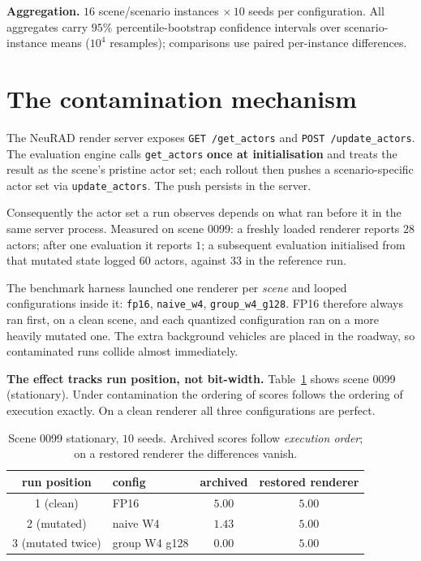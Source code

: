 \documentclass[conference]{IEEEtran}
\begin{document}
\textbf{Aggregation.} $16$ scene/scenario instances $\times\,10$ seeds per configuration. All
aggregates carry $95\%$ percentile-bootstrap confidence intervals over scenario-instance means
($10^4$ resamples); comparisons use paired per-instance differences.

\section{The contamination mechanism}
\label{sec:mech}
The NeuRAD render server exposes \texttt{GET /get\_actors} and \texttt{POST /update\_actors}. The
evaluation engine calls \texttt{get\_actors} \textbf{once at initialisation} and treats the result
as the scene's pristine actor set; each rollout then pushes a scenario-specific actor set via
\texttt{update\_actors}. The push persists in the server.

Consequently the actor set a run observes depends on what ran before it in the same server
process. Measured on scene 0099: a freshly loaded renderer reports $28$ actors; after one
evaluation it reports $1$; a subsequent evaluation initialised from that mutated state logged
$60$ actors, against $33$ in the reference run.

The benchmark harness launched one renderer per \emph{scene} and looped configurations inside it:
\texttt{fp16}, \texttt{naive\_w4}, \texttt{group\_w4\_g128}. FP16 therefore always ran first, on a
clean scene, and each quantized configuration ran on a more heavily mutated one. The extra
background vehicles are placed in the roadway, so contaminated runs collide almost immediately.

\textbf{The effect tracks run position, not bit-width.} Table~\ref{tab:position} shows scene 0099
(stationary). Under contamination the ordering of scores follows the ordering of execution
exactly. On a clean renderer all three configurations are perfect.

\begin{table}[t]\centering
\caption{Scene 0099 stationary, $10$ seeds. Archived scores follow \emph{execution order};
on a restored renderer the differences vanish.}
\label{tab:position}
\begin{tabular}{clcc}
\toprule
run position & config & archived & restored renderer \\
\midrule
1 (clean) & FP16 & $5.00$ & $5.00$ \\
2 (mutated) & naive W4 & $1.43$ & $\mathbf{5.00}$ \\
3 (mutated twice) & group W4 g128 & $0.00$ & $\mathbf{5.00}$ \\
\bottomrule
\end{tabular}
\end{table}
\end{document}
